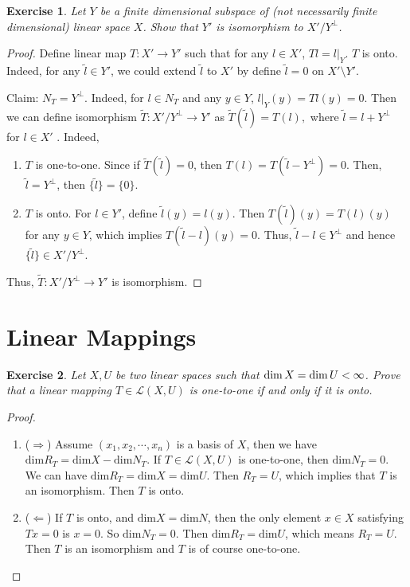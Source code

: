 \documentclass[10pt]{book}
\newtheorem{exercise}{Exercise}[section]
\theoremstyle{definition}
\numberwithin{equation}{chapter}
\begin{document}
\begin{exercise}{\bf *}
Let $Y$ be a finite dimensional subspace of (not necessarily finite dimensional) linear space $X$. Show that $Y'$ is isomorphism to $X'/Y^\bot${\rm \cite{12}}.
\end{exercise}
\begin{proof}
Define linear map $T: X' \to Y'$ such that for any $l \in X'$, $Tl = l|_Y$. $T$ is onto. Indeed, for any $\tilde{l} \in Y'$, we could extend $\tilde{l}$ to $X'$ by define $\tilde{l} = 0$ on $X'\setminus Y'$.

Claim: $N_T = Y^\bot$. Indeed, for $l \in N_T$ and any $y \in Y$, $l|_Y(y) = Tl(y) = 0$. Then we can define isomorphism $\widetilde{T}: X'/Y^\bot \to Y'$ as $\widetilde{T}(\tilde{l}) = T(l),$ where $\tilde{l} = l + Y^\bot$ for $l \in X'$ \cite{14}. Indeed, 
\begin{enumerate}[label=(\alph*)]
    \item $T$ is one-to-one. Since if $\widetilde{T}(\tilde{l}) = 0$, then $T(l) = T\left(\tilde{l} - Y^\bot\right) = 0$. Then, $\tilde{l} = Y^\bot$, then $\{\tilde{l}\} = \{0\}$.
    
    \item $T$ is onto. For $l \in Y'$, define $\tilde{l}(y) = l(y)$. Then $T(\tilde{l})(y) = T(l)(y)$ for any $y \in Y$, which implies $T(\tilde{l} - l)(y) = 0$. Thus, $\tilde{l} - l \in Y^\bot$ and hence $\{\tilde{l}\} \in X'/Y^\bot$.
\end{enumerate}
Thus, $\widetilde{T}: X'/Y^\bot \to Y'$ is isomorphism.
\end{proof}

\medskip

\section{Linear Mappings}
\begin{exercise}
Let $X,U$ be two linear spaces such that ${\rm dim}\, X = {\rm dim}\, U < \infty$. Prove that a linear mapping $T\in\mathscr{L}(X,U)$ is one-to-one if and only if it is onto.
\end{exercise}
\begin{proof}
~\begin{enumerate}[label=(\arabic*)]
    \item ($\Rightarrow$) Assume $(x_1, x_2, \cdots, x_n)$ is a basis of $X$, then we have
    $\text{dim} R_T = \text{dim} X - \text{dim} N_T$. If $T\in \mathscr{L}(X,U)$ is one-to-one, then $\text{dim} N_T = 0$. We can have 
    $\text{dim} R_T = \text{dim} X = \text{dim} U$. Then $R_T = U$, which implies that $T$ is an isomorphism. Then $T$ is onto.
    \item ($\Leftarrow$) If $T$ is onto, and $\text{dim} X = \text{dim} N$, then the only element $x\in X$ satisfying $Tx = 0$ is $x = 0$. So $\text{dim} N_T = 0$. Then $\text{dim} R_T = \text{dim} U$, which means $R_T = U$. Then $T$ is an isomorphism and $T$ is of course one-to-one.
\end{enumerate}
\end{proof}
\end{document}
